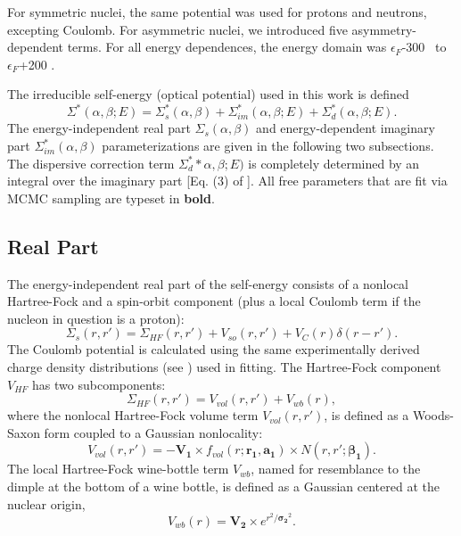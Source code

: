 \documentclass[twocolumn,secnumarabic,amssymb, nobibnotes, aps, prl,
superscriptaddress, nobalancelastpage, floatfix]{revtex4}
\begin{document}
{For symmetric nuclei, the same potential was used for protons and neutrons,
excepting Coulomb. For asymmetric nuclei, we introduced five asymmetry-dependent terms.
For all energy dependences, the energy domain was $\epsilon_{F}$-300
 \mega\electronvolt\ to $\epsilon_{F}$+200 \mega\electronvolt.

The irreducible self-energy (optical potential) used in this work is defined
\begin{equation} \label{SelfEnergyBreakdown}
        \Sigma^{*}(\alpha,\beta;E) =  \Sigma_{s}^{*}(\alpha,\beta)
        + \Sigma_{im}^{*}(\alpha,\beta;E) + \Sigma_{d}^{*}(\alpha,\beta;E).
\end{equation}
The energy-independent real part $\Sigma_{s}(\alpha,\beta)$ and 
energy-dependent imaginary part $\Sigma_{im}^{*}(\alpha,\beta)$
parameterizations are given in the following two subsections. The
dispersive correction term $\Sigma_{d}^{*}*\alpha,\beta;E)$ is completely
determined by an integral over the imaginary part [Eq. (3) of
\cite{Mahzoon2014}]. All free parameters that are fit via MCMC sampling are
typeset in \textbf{bold}.

\subsection{Real Part}
The energy-independent real part of the self-energy consists of a nonlocal Hartree-Fock and
a spin-orbit component (plus a local Coulomb term if the nucleon in question is a proton):
\begin{equation}
    \Sigma_{s}(r,r') =
    \Sigma_{HF}(r,r')+V_{so}(r,r')+V_{C}(r)\delta(r-r').
\end{equation}
The Coulomb potential is calculated using the same experimentally derived charge
density distributions (see \cite{DeVries1987}) used in fitting.
The Hartree-Fock component $V_{HF}$ has two subcomponents:
\begin{equation} \label{HFWBEquation}
    \Sigma_{HF}(r,r') = V_{vol}(r,r') + V_{wb}(r),
\end{equation}
where the nonlocal Hartree-Fock volume term $V_{vol}(r,r')$, is defined as
a Woods-Saxon form coupled to a Gaussian nonlocality:
\begin{equation} \label{RealVolume}
    V_{vol}(r,r') = -\mathbf{V_{1}}{\times}f_{vol}(r; \mathbf{r_{1}}, \mathbf{a_{1}})
    {\times}N(r,r';\boldsymbol{\beta_{1}}).
\end{equation}
The local Hartree-Fock wine-bottle
term $V_{wb}$, named for resemblance to the dimple at the bottom of a wine
bottle, is defined as a Gaussian centered at the nuclear origin,
\begin{equation}
    V_{wb}(r) = \mathbf{V_{2}}{\times}e^{r^{2}/\boldsymbol{\sigma_{2}}^{2}}.
\end{equation}

}
\end{document}
